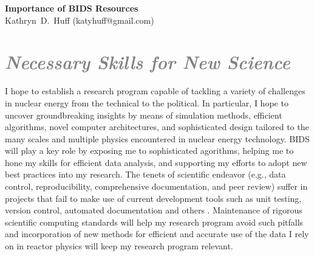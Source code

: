 \documentclass[a4paper, 12pt]{article}
\makeatletter
\newcommand{\authorname}{Kathryn~D.~Huff }
\newcommand{\authoremail}{katyhuff@gmail.com}
\newcommand{\authorsite}{katyhuff.github.com}
\makeatother
\begin{document}
\pagestyle{fancy}
\lhead{\textcolor{gray}{\it \authorname}}
\rhead{\textcolor{gray}{\thepage/\totalpages{}}}
\renewcommand{\headrulewidth}{0pt} 
\renewcommand{\footrulewidth}{0pt} 
\fancyfoot[C]{\footnotesize \textcolor{gray}{\authorsite}} 

\begin{center}
{\LARGE \bf Importance of BIDS Resources}\\
\vspace*{0.1cm}
{\normalsize \authorname (\authoremail)}
\end{center}




\section*{\textcolor{gray}{\it Necessary Skills for New Science}}
I hope to establish a research program capable of tackling a 
variety of challenges in nuclear energy from the technical to the political.  
In particular, I hope to uncover groundbreaking insights by means of simulation methods, 
efficient algorithms, novel computer architectures, and sophisticated design 
tailored to the many scales and multiple physics encountered in nuclear energy 
technology. BIDS will play a key role by exposing me to sophisticated agorithms, 
helping me to hone my skills for efficient data analysis, and 
supporting my efforts to adopt new best practices into my research.
The tenets of scientific endeavor (e.g., data control, reproducibility, 
comprehensive documentation, and peer review) suffer in projects that fail to 
make use of current development tools such as unit testing, version control, 
automated documentation and others \cite{wilson_best_2014, 
merali_computational_2010}.  Maintenance of rigorous scientific computing 
standards will help my research program avoid such pitfalls 
\cite{huff_rapid_2011} and incorporation of new methods for efficient and 
accurate use of the data I rely on in reactor physics will keep my research 
program relevant.
\end{document}
